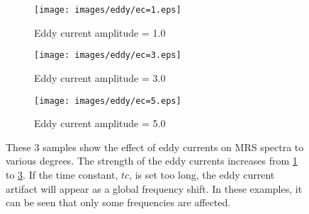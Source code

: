 \begin{figure}[b]
    \centering
    \begin{subfigure}{0.32\textwidth}
        \texttt{[image: images/eddy/ec=1.eps]}
        \caption{Eddy current amplitude = 1.0}
        \label{subfig:ec=1}        
    \end{subfigure}
    \begin{subfigure}{0.32\textwidth}
        \texttt{[image: images/eddy/ec=3.eps]}
        \caption{Eddy current amplitude = 3.0}
        \label{subfig:ec=3}        
    \end{subfigure}
    \begin{subfigure}{0.32\textwidth}
        \texttt{[image: images/eddy/ec=5.eps]}
        \caption{Eddy current amplitude = 5.0}
        \label{subfig:ec=5}        
    \end{subfigure}
    \caption{These 3 samples show the effect of eddy currents on MRS spectra to various degrees. The strength of the eddy currents increases from \ref{subfig:ec=1} to \ref{subfig:ec=5}. If the time constant, $tc$, is set too long, the eddy current artifact will appear as a global frequency shift. In these examples, it can be seen that only some frequencies are affected.}
    \label{fig:eddy currents}
\end{figure}
